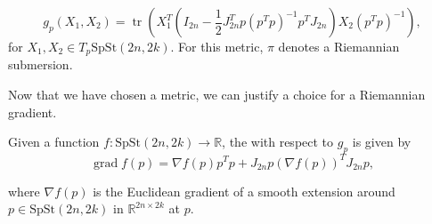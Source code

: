 \begin{equation}\label{eq:spst_metric}
    g_{p}(X_{1},X_{2})=\operatorname{tr}\left(X_{1}^{T}\left(I_{2n}- \frac{1}{2}J_{2n}^{T}p(p^{T}p)^{-1}p^{T}J_{2n}\right)X_{2}(p^{T}p)^{-1}\right),
\end{equation}
for $X_{1},X_{2}\in T_{p}\mathrm{SpSt}(2n, 2k)$. For this metric, $\pi$ denotes a Riemannian submersion.

Now that we have chosen a metric, we can justify a choice for a Riemannian gradient. 
\begin{proposition}
    Given a function $f:\mathrm{SpSt}(2n, 2k)\xrightarrow{}\mathbb{R}$, the  with respect to $g_{p}$ is given by
    \begin{equation}\label{eq:rie_grad}
        \operatorname{grad}f(p)=\nabla f(p)p^{T}p+J_{2n}p(\nabla f(p))^{T}J_{2n}p,
    \end{equation}
    
    where $\nabla f(p)$ is the Euclidean gradient of a smooth extension around $p\in \mathrm{SpSt}(2n, 2k)$ in $\mathbb{R}^{2n\times2k}$ at $p$.
\end{proposition}
